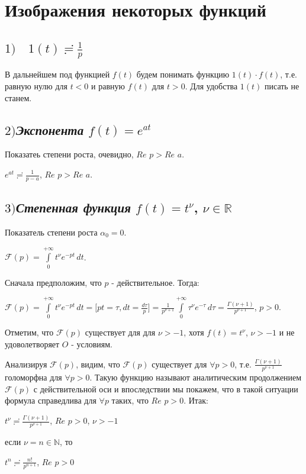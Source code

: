 \documentclass[a4paper, 12pt]{report}
\begin{document}
\section{Изображения некоторых функций}
\subsection*{$1) \quad 1(t) \risingdotseq \frac{1}{p}$}
В дальнейшем под функцией $f(t)$ будем понимать функцию $1(t) \cdot f(t)$, т.е. равную нулю для $t < 0$ и равную $f(t)$ для $t > 0$. Для удобства $1(t)$ писать не станем.

\subsection*{$2)$\quad\textsl{Экспонента} $f(t) = e^{at}$}
Показатеь степени роста, очевидно, $Re$ $p > Re$ $a$.
\par\bigskip
\begin{center}
    $e^{at} \risingdotseq \frac{1}{p - a}$, $Re$ $p > Re$ $a$.
\end{center}
\par\bigskip
\subsection*{$3)$\quad\textsl{Степенная функция} $f(t) = t^\nu$, $\nu \in \mathbb{R}$}

Показатель степени роста $\alpha_0 = 0$.
\par\bigskip
$\mathcal{F}(p) = \int\limits_{0}^{+\infty} t^{\nu}  e^{-pt}\, dt$.
\par\bigskip
Сначала предположим, что $p$ - действительное. Тогда:
\par\bigskip
$\mathcal{F}(p) = \int\limits_{0}^{+\infty} t^\nu e^{-pt}\,dt = \biggl[ pt = \tau, dt = \frac{d\tau}{p} \biggr] = \frac{1}{p^{\nu + 1}} \int\limits_{0}^{+\infty} \tau^\nu e^{-\tau}\,d\tau = \frac{\Gamma(\nu + 1)}{p^{\nu + 1}}$, $p > 0$.
\par\bigskip
Отметим, что $\mathcal{F}(p)$ существует для для $\nu > -1$, хотя $f(t) = t^\nu$, $\nu > -1$ и не удоволетворяет $O$ -  условиям.
\par\bigskip
Анализируя $\mathcal{F}(p)$, видим, что $\mathcal{F}(p)$ существует для $\forall p > 0$, т.е.  $\frac{\Gamma(\nu + 1)}{p^{\nu + 1}}$ голоморфна для $\forall p > 0$. Такую функцию называют аналитическим продолжением $\mathcal{F}(p)$ с действительной оси и впоследствии мы покажем, что в такой ситуации формула справедлива для $\forall p$ таких, что $Re$ $p > 0$. Итак:
\begin{center}
    $t^\nu \risingdotseq \frac{\Gamma(\nu + 1)}{p^{\nu + 1}}$, $Re$ $p > 0$, $\nu > -1$
\end{center}
\par\bigskip
если $\nu = n  \in \mathbb{N}$, то
\begin{center}
    $t^n \risingdotseq \frac{n!}{p^{n + 1}}$, $Re$ $p > 0$
\end{center}
\end{document}
